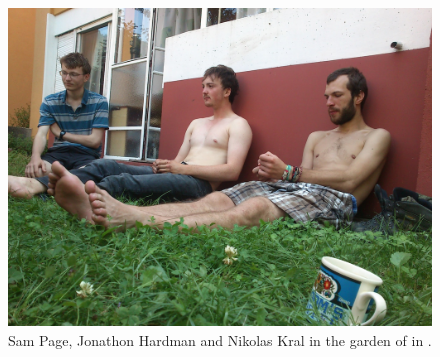 

\begin{figure}
\checkoddpage \ifoddpage \forcerectofloat \else \forceversofloat \fi
   \centering
\includegraphics[width = \textwidth]{2012/piss_bandits/JarvistMooreFrost-DSC_0288--orig.jpg}
\caption{Sam Page, Jonathon Hardman and Nikolas Kral in the garden of  in . } \label{flat garden}
\end{figure}